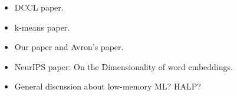 \begin{itemize}
	\item DCCL paper.
	\item k-means paper.
	\item Our paper and Avron's paper.
	\item NeurIPS paper: On the Dimensionality of word embeddings.
	\item General discussion about low-memory ML? HALP?
\end{itemize}